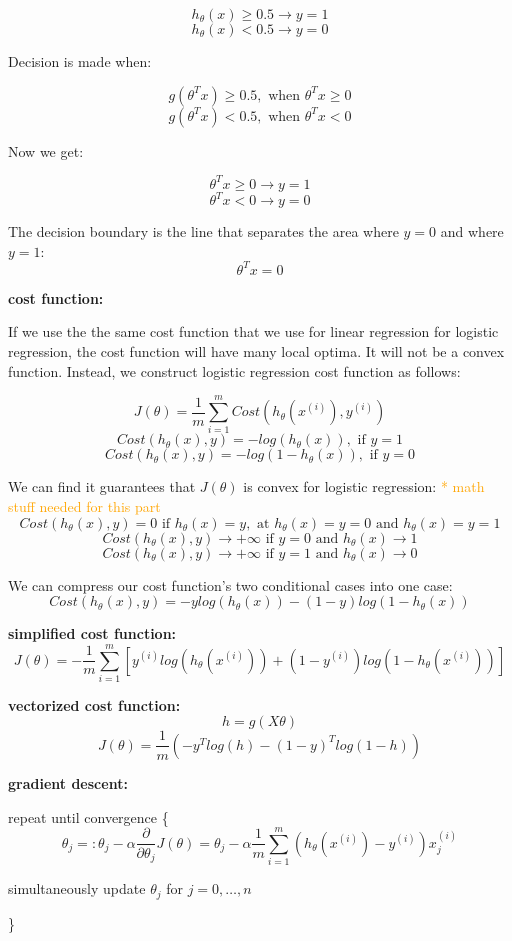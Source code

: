\documentclass{article}
\begin{document}
\[h_{\theta} (x) \geq 0.5 \rightarrow y = 1\]
\[h_{\theta} (x) < 0.5 \rightarrow y = 0\]

\noindent Decision is made when:

\[g(\theta^T x) \geq 0.5, \text{ when } \theta^T x \geq 0\]
\[g(\theta^T x) < 0.5, \text{ when } \theta^T x < 0\]

\noindent Now we get:

\[\theta^T x \geq 0 \rightarrow y = 1\]
\[\theta^T x < 0 \rightarrow y = 0\]

\noindent The decision boundary is the line that separates the area where \(y = 0\) and where \(y = 1\):
\[\theta^T x = 0\]

\noindent \textbf{cost function:}

\noindent If we use the the same cost function that we use for linear regression for logistic regression, the cost function will have many local optima. It will not be a convex function. Instead, we construct logistic regression cost function as follows:

\[J(\theta) = \frac{1}{m} \sum_{i = 1}^m Cost(h_{\theta}(x^{(i)}), y^{(i)})\]
\[Cost(h_{\theta}(x), y) = -log(h_{\theta}(x)), \text{ if } y = 1\]
\[Cost(h_{\theta}(x), y) = -log(1 - h_{\theta}(x)), \text{ if } y = 0\]

\noindent We can find it guarantees that \(J(\theta)\) is convex for logistic regression: \textcolor{orange}{ * math stuff needed for this part}
\[
Cost(h_{\theta}(x), y) = 0 \text{ if }
h_{\theta}(x) = y, \text{ at } h_{\theta}(x) = y = 0 \text{ and } 
h_{\theta}(x) = y = 1
\]
\[
Cost(h_{\theta}(x), y) \rightarrow +\infty
\text{ if } y = 0 \text{ and }
h_{\theta}(x) \rightarrow 1
\]
\[
Cost(h_{\theta}(x), y) \rightarrow +\infty
\text{ if } y = 1 \text{ and }
h_{\theta}(x) \rightarrow 0
\]

\noindent We can compress our cost function's two conditional cases into one case:
\[Cost(h_{\theta} (x), y) 
= - y log(h_{\theta} (x)) - (1 - y) log(1 - h_{\theta} (x))\]

\noindent \textbf{simplified cost function:}
\[J(\theta) = - \frac{1}{m} \sum_{i = 1}^{m} [y^{(i)} log(h_{\theta} (x^{(i)})) + (1 - y^{(i)}) log(1 - h_{\theta} (x^{(i)}))]\]

\noindent \textbf{vectorized cost function:}
\[h = g(X\theta)\]
\[J(\theta) = \frac{1}{m} (- y^T log(h) - (1 - y)^T log(1 - h))\]

\noindent \textbf{gradient descent:}

\noindent repeat until convergence \{
\[\theta_j =: \theta_j - \alpha \frac{\partial}{\partial \theta_j} J(\theta) = \theta_j - \alpha \frac{1}{m} \sum_{i = 1}^m (h_{\theta}(x^{(i)}) - y^{(i)}) x^{(i)}_j\]
\centerline{simultaneously update \(\theta_j\) for \(j = 0, \dots, n\)}
\}
\end{document}
